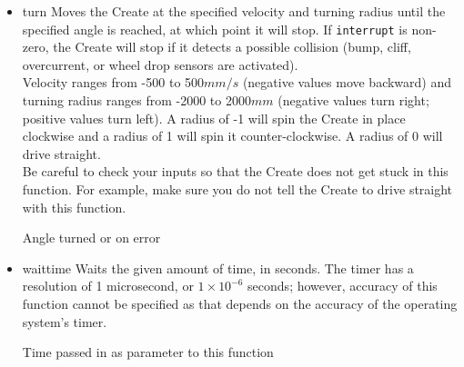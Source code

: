 \documentclass {article}
\begin{document}
\begin {itemize}
  \item {} {turn}
        Moves the Create at the specified velocity and turning radius until the specified angle
        is reached, at which point it will stop.  If {\tt interrupt} is non-zero,
        the Create will stop if it detects a possible collision (bump, cliff, overcurrent, or wheel
        drop sensors are activated). \\
        Velocity ranges from -500 to 500$mm/s$ (negative values move backward) and turning radius
        ranges from -2000 to 2000$mm$ (negative values turn right; positive values turn left).  A
        radius of -1 will spin the Create in place clockwise and a radius of 1 will spin it
        counter-clockwise.  A radius of 0 will drive straight. \\
        Be careful to check your inputs so that the Create does not get stuck in this function.  For
        example, make sure you do not tell the Create to drive straight with this function. \\
        \ret Angle turned or \fail on error 

  \item {} {waittime}
         Waits the given amount of time, in seconds.  The timer has a resolution of 1 microsecond,
         or $1\times 10^{-6}$ seconds; however, accuracy of this function cannot be specified as
         that depends on the accuracy of the operating system's timer. \\
         \ret Time passed in as parameter to this function


\end{itemize}
\end{document}
